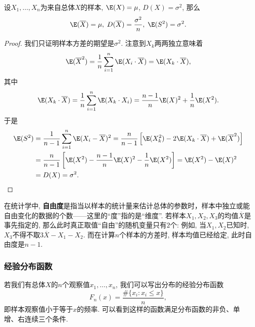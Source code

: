 \documentclass[11pt]{ctexart}
\begin{document}
\begin{proposition}\label{prop:sample}
	设$X_1, \dots, X_n$为来自总体$X$的样本, $\E(X) = \mu$, $D(X) = \sigma^2$, 那么
	\begin{equation*}
		\E(\overline{X}) = \mu,\;
		D(\overline{X}) = \frac{\sigma^2}{n},\;
		\E(S^2) = \sigma^2. 
	\end{equation*}
\end{proposition}
\begin{proof}
	我们只证明样本方差的期望是$\sigma^2$. 
	注意到$X_k$两两独立意味着
	\begin{equation*}
		\E(\overline{X}^2) 
		= \frac{1}{n} \sum_{i=1}^n \E(X_i \cdot \overline{X}) 
		= \E(X_k \cdot \overline{X}), 
	\end{equation*}
	其中
	\begin{equation*}
		\E(X_k \cdot \overline{X})
		= \frac{1}{n} \sum_{i=1}^n \E(X_k \cdot X_i)
		= \frac{n-1}{n} \E(X)^2 + \frac{1}{n} \E(X^2). 
	\end{equation*}
	于是
	\begin{align*}
		\E(S^2)
		&= \frac{1}{n-1} \sum_{i=1}^n \E (X_i - \overline{X})^2
		= \frac{n}{n-1} \left[ \E(X_k^2) - 2 \E(X_k \cdot \overline{X}) + \E(\overline{X}^2) \right] \\
		&= \frac{n}{n-1} \left[ \E(X^2) - \frac{n-1}{n} \E(X)^2 - \frac{1}{n} \E(X^2) \right] 
		= \E(X^2) - \E(X)^2 \\
		&= D(X) = \sigma^2. 
	\end{align*}
\end{proof}
\begin{remark}
	在统计学中, \textbf{自由度}是指当以样本的统计量来估计总体的参数时，样本中独立或能自由变化的数据的个数——这里的“度”指的是“维度”. 
	若样本$X_1, X_2, X_3$的均值$\overline{X}$是事先指定的, 那么此时真正取值“自由”的随机变量只有$2$个: 
	例如, 当$X_1, X_2$已知时, $X_3$不得不取$3 \overline{X} - X_1 - X_2$. 
	而在计算$n$个样本的方差时, 样本均值已经给定, 此时自由度是$n-1$. 
\end{remark}


\subsubsection{经验分布函数}

若我们有总体$X$的$n$个观察值$x_1, \dots, x_n$, 我们可以写出分布的经验分布函数
\begin{equation*}
	F_n(x) = \frac{\# \{x_i \colon x_i \leq x\}}{n},  
\end{equation*}
即样本观察值小于等于$x$的频率. 
可以看到这样的函数满足分布函数的非负、单增、右连续三个条件. 
\end{document}
